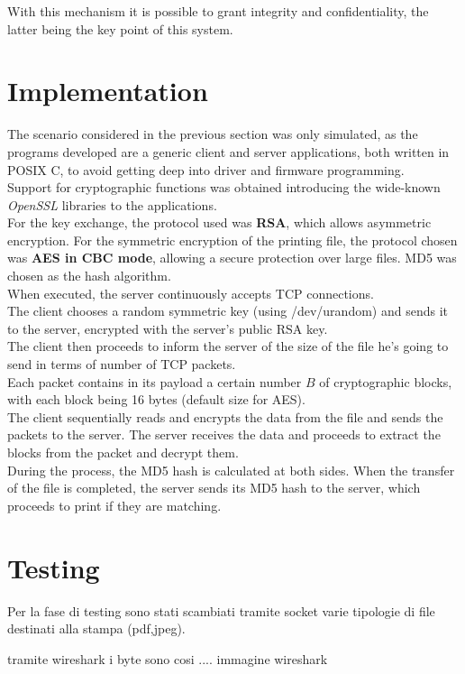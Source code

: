 \documentclass[]{report}
\begin{document}
With this mechanism it is possible to grant integrity and confidentiality, the latter being the key point of this system.


\section*{Implementation}

The scenario considered in the previous section was only simulated, as the programs developed are a generic client and server applications, both written in POSIX C, to avoid getting deep into driver and firmware programming.\\

Support for cryptographic functions was obtained introducing the wide-known \textit{OpenSSL} libraries to the applications.\\

For the key exchange, the protocol used was \textbf{RSA}, which allows asymmetric encryption.
For the symmetric encryption of the printing file, the protocol chosen was \textbf{AES in CBC mode}, allowing a secure protection over large files.
MD5 was chosen as the hash algorithm.\\

When executed, the server continuously accepts TCP connections.\\
The client chooses a random symmetric key (using /dev/urandom) and sends it to the server, encrypted with the server's public RSA key.\\
The client then proceeds to inform the server of the size of the file he's going to send in terms of number of TCP packets.\\
Each packet contains in its payload a certain number $B$ of cryptographic blocks, with each block being 16 bytes (default size for AES).\\
The client sequentially reads and encrypts the data from the file and sends the packets to the server. The server receives the data and proceeds to extract the blocks from the packet and decrypt them.\\
During the process, the MD5 hash is calculated at both sides. When the transfer of the file is completed, the server sends its MD5 hash to the server, which proceeds to print if they are matching. 


\section*{Testing}

Per la fase di testing sono stati scambiati tramite socket varie tipologie di file destinati alla stampa (pdf,jpeg).

tramite wireshark i byte sono cosi .... immagine wireshark








	
	
\end{document}
